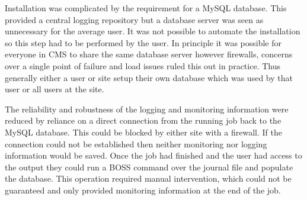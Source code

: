 
Installation was complicated by the requirement for a MySQL database. This provided a central logging repository but a database server was seen as unnecessary for the average user. It was not possible to automate the installation so this step had to be performed by the user. In principle it was possible for everyone in CMS to share the same database server however firewalls, concerns over a single point of failure and load issues ruled this out in practice. Thus generally either a user or site setup their own database which was used by that user or all users at the site.



The reliability and robustness of the logging and monitoring information were reduced by reliance on a direct connection from the running job back to the MySQL database. This could be blocked by either site with a firewall. If the connection could not be established then neither monitoring nor logging information would be saved. Once the job had finished and the user had access to the output they could run a BOSS command over the journal file and populate the database. This operation required manual intervention, which could not be guaranteed and only provided monitoring information at the end of the job. 



